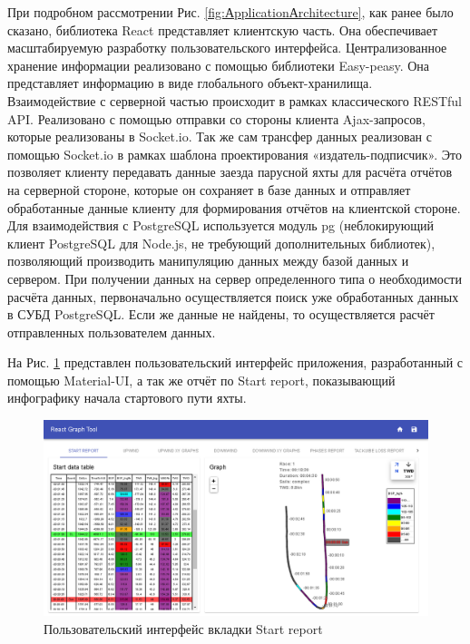 При подробном рассмотрении Рис. \ref{fig:АpplicationАrchitecture}, как ранее было сказано, библиотека React представляет клиентскую часть. Она обеспечивает масштабируемую разработку пользовательского интерфейса. Централизованное хранение информации реализовано с помощью библиотеки Easy-peasy. Она представляет информацию в виде глобального объект-хранилища. Взаимодействие с серверной частью происходит в рамках классического RESTful API. Реализовано с помощью отправки со стороны клиента Ajax-запросов, которые реализованы в Socket.io. Так же сам трансфер данных реализован с помощью Socket.io в рамках шаблона проектирования «издатель-подписчик». Это позволяет клиенту передавать данные заезда парусной яхты для расчёта отчётов на серверной стороне, которые он сохраняет в базе данных и отправляет обработанные данные клиенту для формирования отчётов на клиентской стороне. Для взаимодействия с PostgreSQL используется модуль pg\cite{pgnpm78:online} (неблокирующий клиент PostgreSQL для Node.js, не требующий дополнительных библиотек), позволяющий производить манипуляцию данных между базой данных и сервером. При получении данных на сервер определенного типа о необходимости расчёта данных, первоначально осуществляется поиск уже обработанных данных в СУБД PostgreSQL. Если же данные не найдены, то осуществляется расчёт отправленных пользователем данных. 

На Рис. \ref{fig:rgt_startReport} представлен пользовательский интерфейс приложения, разработанный с помощью Material-UI, а так же отчёт по Start report, показывающий инфографику начала стартового пути яхты.






\begin{figure}[hb]
	\centering
	\includegraphics[scale=0.35]{my_folder/images/rgt_startReport}
	\caption{Пользовательский интерфейс вкладки Start report}
	\label{fig:rgt_startReport}
\end{figure}


